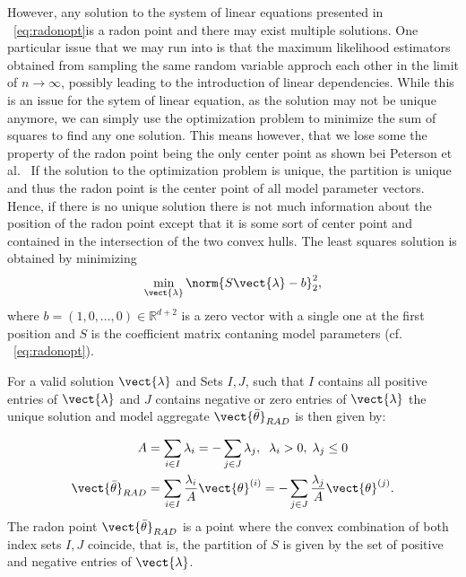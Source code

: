 However, any solution to the system of linear equations presented in \eq~\ref{eq:radonopt}is a radon point and there may exist multiple solutions.
One particular issue that we may run into is that the maximum likelihood estimators obtained from sampling the same random variable approch each other in the limit of $n \rightarrow \infty$, possibly leading to the introduction of linear dependencies.
While this is an issue for the sytem of linear equation, as the solution may not be unique anymore, we can simply use the optimization problem to minimize the sum of squares to find any one solution.
This means however, that we lose some the property of the radon point being the only center point as shown bei Peterson et al.~\cite{peterson1972geometry}
If the solution to the optimization problem is unique, the partition is unique and thus the radon point is the center point of all model parameter vectors.
Hence, if there is no unique solution there is not much information about the position of the radon point except that it is some sort of center point and contained in the intersection of the two convex hulls.
The least squares solution is obtained by minimizing
\begin{equation}
    \label{eq:lstsq}
        \min_{\vect{\lambda}} \norm{S\vect{\lambda} - b}^2_2,
\end{equation}
where $b=(1, 0, \ldots, 0) \in \mathbb{R}^{d+2}$ is a zero vector with a single one at the first position and $S$ is the coefficient matrix contaning model parameters (cf. \eq~\ref{eq:radonopt}).

For a valid solution $\vect{\lambda}$ and Sets $I,J$, such that $I$ contains all positive entries of $\vect{\lambda}$ and $J$ contains negative or zero entries of $\vect{\lambda}$ the unique solution and model aggregate $\vect{\bar{\theta}}_{RAD}$ is then given by:

\begin{equation}
    \label{eq:radonpoint}
    \begin{split}
    A &= \sum_{i\in I} \lambda_i = - \sum_{j\in J} \lambda_j, \; \;\lambda_i > 0, \; \lambda_j \leq 0 \\
    \vect{\bar{\theta}}_{RAD} &= \sum_{i\in I} \frac{\lambda_i}{A} \vect{\theta}^{(i)} = - \sum_{j\in J} \frac{\lambda_j}{A} \vect{\theta}^{(j)}.
    \end{split}
\end{equation}
The radon point $\vect{\bar{\theta}}_{RAD}$ is a point where the convex combination of both index sets $I, J$ coincide, that is, the partition of $S$ is given by the set of positive and negative entries of $\vect{\lambda}$.


